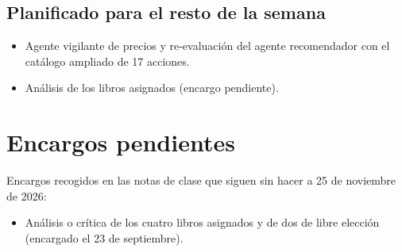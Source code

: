 \documentclass[11pt,a4paper]{article}
\begin{document}
	\subsection*{Planificado para el resto de la semana}
	\begin{itemize}
		\item Agente vigilante de precios y re-evaluación del agente recomendador con el catálogo ampliado de 17 acciones.
		\item Análisis de los libros asignados (encargo pendiente).
	\end{itemize}
	
	\section*{Encargos pendientes}
	Encargos recogidos en las notas de clase que siguen sin hacer a 25 de noviembre de 2026:
	\begin{itemize}
		\item Análisis o crítica de los cuatro libros asignados y de dos de libre elección (encargado el 23 de septiembre).
	\end{itemize}
\end{document}
